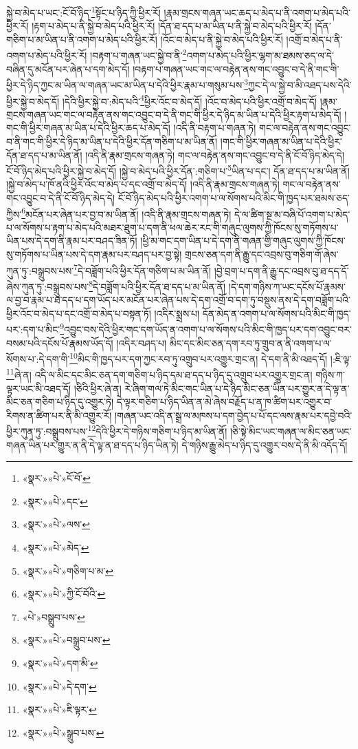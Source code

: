 སྐྱེ་བ་མེད་པ་ཡང་:ངོ་བོ་ཉིད་\footnote{«སྣར་»«པེ་»ངོ་བོ་}སྟོང་པ་ཉིད་ཀྱི་ཕྱིར་རོ། །རྣམ་གྲངས་གཞན་ཡང་ཆད་པ་མེད་པ་ནི་འགག་པ་མེད་པའི་ཕྱིར་རོ། །རྟག་པ་མེད་པ་ནི་སྐྱེ་བ་མེད་པའི་ཕྱིར་རོ། །དོན་ཐ་དད་པ་མ་ཡིན་པ་ནི་སྐྱེ་བ་མེད་པའི་ཕྱིར་རོ། །དོན་གཅིག་པ་མ་ཡིན་པ་ནི་འགག་པ་མེད་པའི་ཕྱིར་རོ། །འོང་བ་མེད་པ་ནི་སྐྱེ་བ་མེད་པའི་ཕྱིར་རོ། །འགྲོ་བ་མེད་པ་ནི་འགག་པ་མེད་པའི་ཕྱིར་རོ། །བརྟག་པ་གཞན་ཡང་སྐྱེ་བ་ནི་\footnote{«སྣར་»«པེ་»དང་}འགག་པ་མེད་པའི་ཕྱིར་ལྷག་མ་ཐམས་ཅད་ལ་དེ་བཞིན་དུ་མངོན་པར་ཞེན་པ་དག་མེད་དོ། །བརྟག་པ་གཞན་ཡང་གང་ལ་བརྟེན་ནས་གང་འབྱུང་བ་དེ་ནི་གང་གི་ཕྱིར་དེ་ཉིད་ཀྱང་མ་ཡིན་ལ་གཞན་ཡང་མ་ཡིན་པ་དེའི་ཕྱིར་རྣམ་པ་གསུམ་པས་\footnote{«སྣར་»«པེ་»ལས་}ཀྱང་དེ་ལ་སྐྱེ་བ་མི་འཐད་པས་དེའི་ཕྱིར་སྐྱེ་བ་མེད་དོ། །དེའི་ཕྱིར་སྐྱེ་བ་:མེད་པའི་\footnote{«སྣར་»«པེ་»མེད་}ཕྱིར་འོང་བ་མེད་དོ། །འོང་བ་མེད་པའི་ཕྱིར་འགྲོ་བ་མེད་དོ། །རྣམ་གྲངས་གཞན་ཡང་གང་ལ་བརྟེན་ནས་གང་འབྱུང་བ་དེ་ནི་གང་གི་ཕྱིར་དེ་ཉིད་མ་ཡིན་པ་དེའི་ཕྱིར་རྟག་པ་མེད་དོ། །གང་གི་ཕྱིར་གཞན་མ་ཡིན་པ་དེའི་ཕྱིར་ཆད་པ་མེད་དོ། །འདི་ནི་བརྟག་པ་གཞན་ཏེ། གང་ལ་བརྟེན་ནས་གང་འབྱུང་བ་ནི་གང་གི་ཕྱིར་དེ་ཉིད་མ་ཡིན་པ་དེའི་ཕྱིར་དོན་གཅིག་པ་མ་ཡིན་ནོ། །གང་གི་ཕྱིར་གཞན་མ་ཡིན་པ་དེའི་ཕྱིར་དོན་ཐ་དད་པ་མ་ཡིན་ནོ། །འདི་ནི་རྣམ་གྲངས་གཞན་ཏེ། གང་ལ་བརྟེན་ནས་གང་འབྱུང་བ་དེ་ནི་ངོ་བོ་ཉིད་མེད་དེ། ངོ་བོ་ཉིད་མེད་པའི་ཕྱིར་སྐྱེ་བ་མེད་དོ། །སྐྱེ་བ་མེད་པའི་ཕྱིར་དོན་:གཅིག་པ་\footnote{«སྣར་»«པེ་»གཅིག་པ་མ་}ཡིན་པ་དང་། དོན་ཐ་དད་པ་མ་ཡིན་ནོ། །སྐྱེ་བ་མེད་པ་ཁོ་ནའི་ཕྱིར་འོང་བ་མེད་པ་དང་འགྲོ་བ་མེད་དོ། །འདི་ནི་རྣམ་གྲངས་གཞན་ཏེ། གང་ལ་བརྟེན་ནས་གང་འབྱུང་བ་དེ་ནི་ངོ་བོ་ཉིད་མེད་དེ། ངོ་བོ་ཉིད་མེད་པའི་ཕྱིར་འགག་པ་ལ་སོགས་པའི་མིང་གི་ཁྱད་པར་ཐམས་ཅད་ཀྱིས་\footnote{«སྣར་»«པེ་»ཀྱི་ངོ་བོའི་}མངོན་པར་ཞེན་པར་བྱ་བ་མ་ཡིན་ནོ། །འདི་ནི་རྣམ་གྲངས་གཞན་ཏེ། དེ་ལ་ཚིག་སྔ་མ་བཞི་པོ་འགག་པ་མེད་པ་ལ་སོགས་པ་རྟག་པ་མེད་པའི་མཐར་ཐུག་པ་དག་ནི་ཕལ་ཆེར་རང་གི་གཞུང་ལུགས་ཀྱི་ཁོངས་སུ་གཏོགས་པ་ཡིན་པས་དེ་དག་ནི་རྣམ་པར་བཤད་ཟིན་ཏོ། །ཕྱི་མ་གང་དག་ཡིན་པ་དེ་དག་ནི་གཞན་གྱི་གཞུང་ལུགས་ཀྱི་ཁོངས་སུ་གཏོགས་པ་ཡིན་པས་དེ་དག་རྣམ་པར་བཤད་པར་བྱ་སྟེ། གྲངས་ཅན་དག་ནི་རྒྱུ་དང་འབྲས་བུ་གཅིག་གོ་ཞེས་ཀུན་ཏུ་:བསྒྲུབས་པས་\footnote{«པེ་»བསྒྲུབ་པས་}དེ་བཟློག་པའི་ཕྱིར་དོན་གཅིག་པ་མ་ཡིན་ནོ། །བྱེ་བྲག་པ་དག་ནི་རྒྱུ་དང་འབྲས་བུ་ཐ་དད་དོ་ཞེས་ཀུན་ཏུ་:བསྒྲུབས་པས་\footnote{«སྣར་»«པེ་»བསྒྲུབ་པས་}དེ་བཟློག་པའི་ཕྱིར་དོན་ཐ་དད་པ་མ་ཡིན་ནོ། །དེ་དག་གཉིས་ཀ་ཡང་དངོས་པོ་རྣམས་ལ་བྱ་བ་རྣམ་པ་ཐ་དད་པ་དག་ཡོད་པར་མངོན་པར་ཞེན་པས་དེ་དག་འགྲོ་བ་དག་ཏུ་བསྡུས་ནས་དེ་དག་བཟློག་པའི་ཕྱིར་འོང་བ་མེད་པ་དང་འགྲོ་བ་མེད་པ་བསྟན་ཏོ། །འདིར་སྨྲས་པ། དོན་མེད་ན་འགག་པ་ལ་སོགས་པའི་མིང་གི་ཁྱད་པར་:དག་པ་མིང་\footnote{«སྣར་»«པེ་»དག་མི་}འབྱུང་བས་དེའི་ཕྱིར་གང་དག་ཡོད་ན་འགག་པ་ལ་སོགས་པའི་མིང་གི་ཁྱད་པར་དག་འབྱུང་བར་བསམ་པའི་དངོས་པོ་རྣམས་ཡོད་དོ། །འདིར་བཤད་པ། མིང་དང་མིང་ཅན་དག་རབ་ཏུ་གྲུབ་ན་ནི་འགག་པ་ལ་སོགས་པ་:དེ་དག་གི་\footnote{«སྣར་»«པེ་»དེ་དག་}མིང་གི་ཁྱད་པར་དག་ཀྱང་རབ་ཏུ་འགྲུབ་པར་འགྱུར་གྲང་ན། དེ་དག་ནི་མི་འཐད་དོ། །:ཇི་ལྟ་\footnote{«སྣར་»«པེ་»ཇི་ལྟར་}ཞེ་ན། འདི་ལ་མིང་དང་མིང་ཅན་དག་གཅིག་པ་ཉིད་དམ་ཐ་དད་པ་ཉིད་དུ་འགྲུབ་པར་འགྱུར་གྲང་ན། གཉིས་ཀ་ལྟར་ཡང་མི་འཐད་དོ། །ཅིའི་ཕྱིར་ཞེ་ན། རེ་ཞིག་གལ་ཏེ་མིང་གང་ཡིན་པ་དེ་ཉིད་མིང་ཅན་ཡིན་པར་གྱུར་ན་དེ་ལྟ་ན་མིང་ཅན་གཅིག་པ་ཉིད་དུ་འགྱུར་ཏེ། དེ་ལྟར་གཅིག་པ་ཉིད་ཡིན་ན་མེ་ཞེས་བརྗོད་པ་ན་ཁ་ཚིག་པར་འགྱུར་བ་རིགས་ན་ཚིག་པར་ནི་མི་འགྱུར་རོ། །གཞན་ཡང་འདི་ན་སྒྲ་ལ་མཁས་པ་དག་བྱེད་པ་པོ་དང་ལས་རྣམ་པར་དབྱེ་བའི་ཕྱིར་ཀུན་ཏུ་:བསྒྲུབས་པས་\footnote{«སྣར་»«པེ་»སྒྲུབ་པས་}དེའི་ཕྱིར་དེ་གཉིས་གཅིག་པ་ཉིད་མ་ཡིན་ནོ། །ཅི་སྟེ་མིང་ཡང་གཞན་ལ་མིང་ཅན་ཡང་གཞན་ཡིན་པར་གྱུར་ན་ནི་དེ་ལྟ་ན་ཐ་དད་པ་ཉིད་ཡིན་ཏེ། དེ་གཉིས་རྒྱུ་མེད་པ་ཉིད་དུ་འགྱུར་བས་དེ་ནི་མི་འདོད་དོ། 
